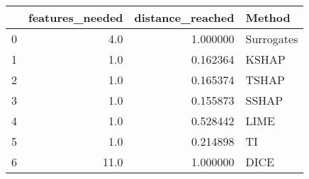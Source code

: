 \begin{tabular}{lrrl}
\toprule
{} &  features\_needed &  distance\_reached &      Method \\
\midrule
0 &              4.0 &          1.000000 &  Surrogates \\
1 &              1.0 &          0.162364 &       KSHAP \\
2 &              1.0 &          0.165374 &       TSHAP \\
3 &              1.0 &          0.155873 &       SSHAP \\
4 &              1.0 &          0.528442 &        LIME \\
5 &              1.0 &          0.214898 &          TI \\
6 &             11.0 &          1.000000 &        DICE \\
\bottomrule
\end{tabular}
